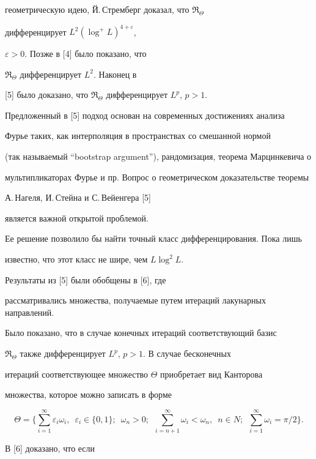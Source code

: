 геометрическую идею, Й.\,Стремберг доказал, что $\Re_{\Theta}$


дифференцирует $L^2 (\log^{+} L) ^{4+\varepsilon}$,


$\varepsilon > 0$. Позже в [4] было показано, что


$\Re_{\Theta}$ дифференцирует $L^2$. Наконец в


[5] было доказано, что $\Re_{\Theta}$ дифференцирует $L^p$, $p>1$.


Предложенный в [5] подход основан на современных достижениях анализа


Фурье таких, как интерполяция в пространствах со смешанной нормой


(так называемый ``bootstrap argument''), рандомизация, теорема Марцинкевича о


мультипликаторах Фурье и пр. Вопрос о геометрическом доказательстве теоремы


А.\,Нагеля, И.\,Стейна и С.\,Вейенгера [5]


является важной открытой проблемой.


Ее решение позволило бы найти точный класс дифференцирования. Пока лишь


известно, что этот класс не шире, чем $L \log^{2} L$.





Результаты из [5] были обобщены в [6], где


рассматривались множества, получаемые путем итераций лакунарных направлений.


Было показано, что в случае конечных итераций соответствующий базис


$\Re_{\Theta}$ также дифференцирует $L^p$, $p>1$. В случае бесконечных


итераций соответствующее множество $\Theta$ приобретает вид Канторова


множества, которое можно записать в форме


$$


\Theta = \bigg\{\sum_{i=1}^{\infty} \varepsilon_i \omega_i,


\ \; \varepsilon_i\in\{0,1\};


\ \; \omega_n>0;\ \; \sum_{i=n+1}^{\infty} \omega_i < \omega_n,


\ \; n \in N;\ \;


\sum_{i=1}^{\infty} \omega_i = \pi / 2 \bigg\}.


$$


В [6] доказано, что если



